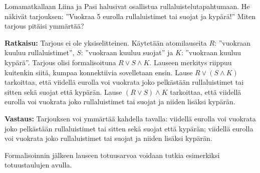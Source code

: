 \begin{esimerkki}
Lomamatkallaan Liina ja Pasi halusivat osallistua rullaluistelutapahtumaan. He  näkivät tarjouksen: ''Vuokraa 5 eurolla rullaluistimet tai suojat ja kypärä!'' Miten tarjous pitäisi ymmärtää?

{\bf Ratkaisu:}
Tarjous ei ole yksiselitteinen. Käytetään atomilauseita $R$: ''vuokraan kuuluu rullaluistimet'', $S$: ''vuokraan kuuluu suojat'' ja $K$: ''vuokraan kuuluu kypärä''. Tarjous olisi formalisoituna $R\lor S \land K$. Lauseen merkitys riippuu kuitenkin siitä, kumpaa	konnektiivia sovelletaan ensin. Lause $R\lor (S\land K)$ tarkoittaa, että viidellä eurolla voi vuokrata joko pelkästään rullaluistimet tai sitten sekä suojat että kypärän. Lause $(R\lor S)\land K$ tarkoittaa, että viidellä eurolla voi vuokrata joko rullaluistimet tai suojat ja niiden lisäksi kypärän. 

{\bf Vastaus:} Tarjouksen voi ymmärtää kahdella tavalla:
viidellä eurolla voi vuokrata joko pelkästään rullaluistimet tai sitten sekä suojat että kypärän; viidellä eurolla voi vuokrata joko rullaluistimet tai suojat ja niiden lisäksi kypärän.
\end{esimerkki}

Formalisoinnin jälkeen lauseen totuusarvoa voidaan tutkia esimerkiksi totuustaulujen avulla.

